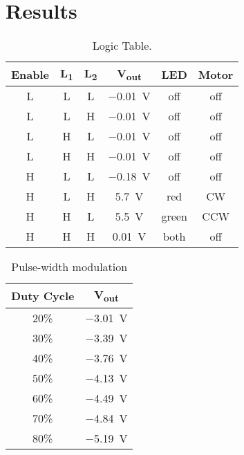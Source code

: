 \section{Results}
\label{sec:results}

\begin{table}[hbtp]
  \centering
  \begin{tabular}{ccc|ccc}
    Enable & \si{L_1} & \si{L_2} & \si{V_{out}} & LED & Motor \\
    \hline
    L & L & L & \SI{-0.01}{V} & off & off \\
    L & L & H & \SI{-0.01}{V} & off & off \\
    L & H & L & \SI{-0.01}{V} & off & off \\
    L & H & H & \SI{-0.01}{V} & off & off \\
    H & L & L & \SI{-0.18}{V} & off & off \\
    H & L & H & \SI{+5.7}{V} & red & CW \\
    H & H & L & \SI{+5.5}{V} & green & CCW \\
    H & H & H & \SI{+0.01}{V} & both & off \\
  \end{tabular}
  \caption{\label{tab:logic} Logic Table. }
\end{table}

\begin{table}[hbtp]
  \centering
  \begin{tabular}{cc}
    Duty Cycle & \si{V_{out}} \\
    \hline
    20\% & \SI{-3.01}{V} \\
    30\% & \SI{-3.39}{V} \\
    40\% & \SI{-3.76}{V} \\
    50\% & \SI{-4.13}{V} \\
    60\% & \SI{-4.49}{V} \\
    70\% & \SI{-4.84}{V} \\
    80\% & \SI{-5.19}{V} \\
  \end{tabular}
  \caption{\label{tab:duty} Pulse-width modulation}
\end{table}



